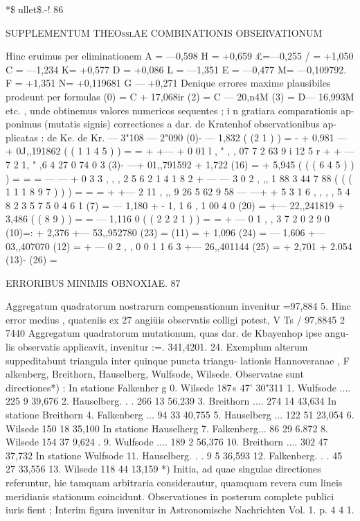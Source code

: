 \documentclass[12pt,a4paper]{article}
\begin{document}
\newpage
*\$ullet\$.-!
86
\begin{center}
\textsc{SUPPLEMENTUM THEOßlAE COMBINATIONIS OBSERVATIONUM}
\end{center}
Hinc eruimus per eliminationem
A = ---0,598 H = +0,659
£=---0,255 / = +1,050
C = ---1,234 K= +0,577
D = +0,086 L = ---1,351
E = ---0,477 M= ---0,109792.
F = +1,351 N= +0,119681
G --- +0,271
Denique errores maxime plausibiles prodeunt per formulas
(0) = C + 17,068ir
(2) = C --- 20,n4M
(3) = D--- 16,993M
etc. , unde obtinemus valores numericos sequentes ; i n gratiara comparationis ap-
ponimus (mutatis signis) correctiones a dar. de Kratenhof observationibus ap-
plicatas :
de Ke. de Kr.
--- 3"108 --- 2"090
(0)- --- 1,832
( (2 1 ) ) = - + 0,981
---+ 0J,,191862 (
(
1
1
4
5
)
)
=
=
+
+--- +
0
01 l ,
"
, , 07
7
2 63
9
i 12
5
r +
+
--- 7
2
1,
"
,6
4
27
0
74
0
3
(3)- ---+ 01,,791592 + 1,722 (16) = + 5,945
( ( ( 6 4 5 ) ) ) = = = --- --- + 0 3 3 , , , 2 5 6 2 1 4 1 8 2 + --- --- 3 0 2 , ,, 1 88 3 44 7 88 ( ( ( 1 1 1 8 9 7 ) ) ) = = = + +--- 2 11 , ,, 9 26 5 62 9 58 --- ---+ + 5 3 1 6 , , , , 5 4 8 2 3 5 7 5 0 4 6 1
(7) = --- 1,180 + - 1, 1 6 , 1 00 4 0 (20) =
+--- 22,,241819 + 3,486
(
(
8
9
)
) =
= --- 1,116 0
(
(
2
2
2
1
)
)
=
= + --- 0 1 , , 3 7 2 0 2 9 0
(10)=: + 2,376 +--- 53,,952780 (23) =
(11) = + 1,096 (24) = --- 1,606 +--- 03,,407070
(12) = + --- 0 2 , , 0 0 1 1 6 3 +--- 26,,401144 (25) = + 2,701 + 2.054
(13)- (26) =

\newpage
\begin{center}
\textsc{ERRORIBUS MINIMIS OBNOXIAE. 87}
\end{center}
Aggregatum quadratorum nostrarurn compensationum invenitur =97,884 5.
Hinc error medius , quateniis ex 27 angiüis observatis colligi potest,
V Ts
/ 97,8845 2 7440
Aggregatum quadratorum mutationum, quas dar. de Kbayenhop ipse angu-
lis observatis applicavit, invenitur :=. 341,4201.
24.
Exemplum alterum suppeditabunt triangula inter quinque puncta triangu-
lationis Hannoveranae , F alkenberg, Breithorn, Hauselberg, Wulfsode, Wilsede.
Observatae sunt directiones*) :
In statione Falkenher g
0. Wilsede 187« 47' 30"311
1. Wulfsode .... 225 9 39,676
2. Hauselberg. . . 266 13 56,239
3. Breithorn .... 274 14 43,634
In statione Breithorn
4. Falkenberg ... 94 33 40,755
5. Hauselberg ... 122 51 23,054
6. Wilsede 150 18 35,100
In statione Hauselherg
7. Falkenberg... 86 29 6.872
8. Wilsede 154 37 9,624 .
9. Wulfsode .... 189 2 56,376
10. Breithorn .... 302 47 37,732
In statione Wulfsode
11. Hauselberg. . . 9 5 36,593
12. Falkenberg. . . 45 27 33,556
13. Wilsede 118 44 13,159
*) Initia, ad quae singulae directiones referuntur, hie tamquam arbitraria considerautur, quamquam
revera cum lineis meridianis stationum coincidunt. Observationes in posterum complete publici iuris fient ;
Interim figura invenitur in Astronomische Nachrichten Vol. 1. p. 4 4 1.
\end{document}
